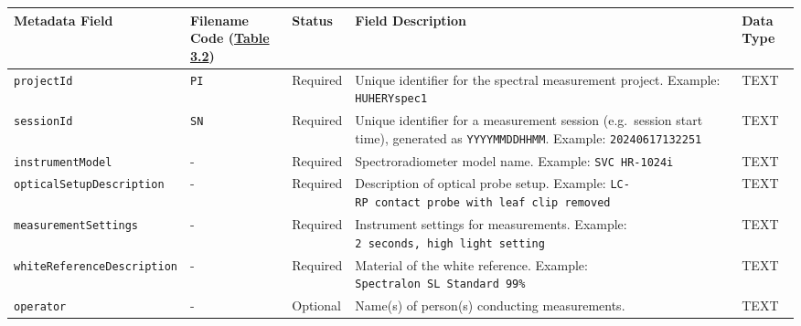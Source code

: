 \documentclass[
  letterpaper,
  DIV=11,
  numbers=noendperiod]{scrreprt}
\begin{document}
\begin{longtable}[]{@{}
  >{\raggedright\arraybackslash}p{}
  >{\raggedright\arraybackslash}p{}
  >{\raggedright\arraybackslash}p{}
  >{\raggedright\arraybackslash}p{}
  >{\raggedright\arraybackslash}p{}@{}}
\toprule\noalign{}
\begin{minipage}[b]{\linewidth}\raggedright
Metadata Field
\end{minipage} & \begin{minipage}[b]{\linewidth}\raggedright
Filename Code (\hyperref[tbl-3-2]{Table 3.2})
\end{minipage} & \begin{minipage}[b]{\linewidth}\raggedright
Status
\end{minipage} & \begin{minipage}[b]{\linewidth}\raggedright
Field Description
\end{minipage} & \begin{minipage}[b]{\linewidth}\raggedright
Data Type
\end{minipage} \\
\midrule\noalign{}
\endhead
\bottomrule\noalign{}
\endlastfoot
\texttt{projectId} & \texttt{PI} & Required & Unique identifier for the
spectral measurement project. Example: \texttt{HUHERYspec1} & TEXT \\
\texttt{sessionId} & \texttt{SN} & Required & Unique identifier for a
measurement session (e.g.~session start time), generated as
\texttt{YYYYMMDDHHMM}. Example: \texttt{20240617132251} & TEXT \\
\texttt{instrumentModel} & - & Required & Spectroradiometer model name.
Example: \texttt{SVC\ HR-1024i} & TEXT \\
\texttt{opticalSetupDescription} & - & Required & Description of optical
probe setup. Example:
\texttt{LC-RP\ contact\ probe\ with\ leaf\ clip\ removed} & TEXT \\
\texttt{measurementSettings} & - & Required & Instrument settings for
measurements. Example: \texttt{2\ seconds,\ high\ light\ setting} &
TEXT \\
\texttt{whiteReferenceDescription} & - & Required & Material of the
white reference. Example: \texttt{Spectralon\ SL\ Standard\ 99\%} &
TEXT \\
\texttt{operator} & - & Optional & Name(s) of person(s) conducting
measurements. & TEXT \\

\end{longtable}
\end{document}
